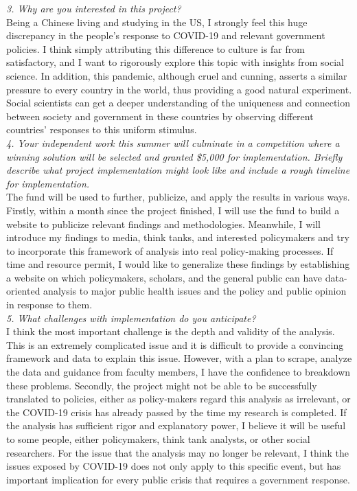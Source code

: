 \documentclass{article}
\begin{document}
\textit{3. Why are you interested in this project?} \\
Being a Chinese living and studying in the US, I strongly feel this huge discrepancy in the people's response to COVID-19 and relevant government policies. I think simply attributing this difference to culture is far from satisfactory, and I want to rigorously explore this topic with insights from social science. In addition, this pandemic, although cruel and cunning, asserts a similar pressure to every country in the world, thus providing a good natural experiment. Social scientists can get a deeper understanding of the uniqueness and connection between society and government in these countries by observing different countries' responses to this uniform stimulus. \\

\textit{4. Your independent work this summer will culminate in a competition where a winning solution will be selected and granted \$5,000 for implementation. Briefly describe what project implementation might look like and include a rough timeline for implementation.}\\
The fund will be used to further, publicize, and apply the results in various ways. Firstly, within a month since the project finished, I will use the fund to build a website to publicize relevant findings and methodologies. Meanwhile, I will introduce my findings to media, think tanks, and interested policymakers and try to incorporate this framework of analysis into real policy-making processes. If time and resource permit, I would like to generalize these findings by establishing a website on which policymakers, scholars, and the general public can have data-oriented analysis to major public health issues and the policy and public opinion in response to them.\\

\textit{5. What challenges with implementation do you anticipate?}\\
I think the most important challenge is the depth and validity of the analysis. This is an extremely complicated issue and it is difficult to provide a convincing framework and data to explain this issue. However, with a plan to scrape, analyze the data and guidance from faculty members, I have the confidence to breakdown these problems. Secondly, the project might not be able to be successfully translated to policies, either as policy-makers regard this analysis as irrelevant, or the COVID-19 crisis has already passed by the time my research is completed. If the analysis has sufficient rigor and explanatory power, I believe it will be useful to some people, either policymakers, think tank analysts, or other social researchers. For the issue that the analysis may no longer be relevant, I think the issues exposed by COVID-19 does not only apply to this specific event, but has important implication for every public crisis that requires a government response.\\
\end{document}
